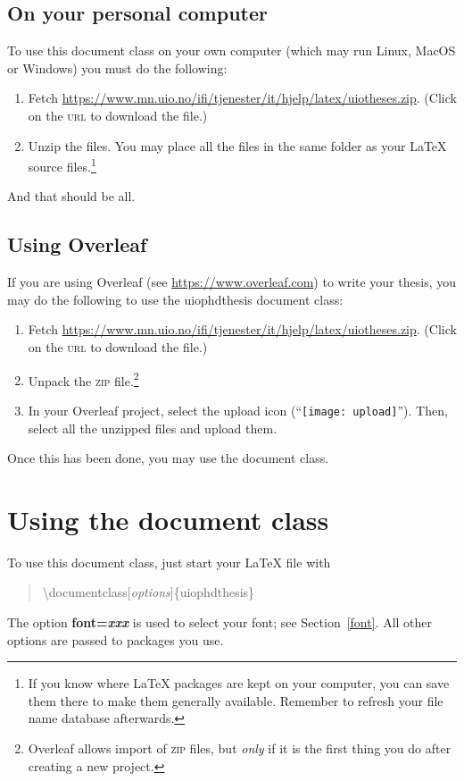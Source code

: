 \documentclass[UKenglish]{uiophdthesis}
\newcommand{\bsl}{\textbackslash}
\newcommand{\p}[1]{\textsf{#1}}
\newcommand{\pb}[1]{\textbf{\p{#1}}}
\newcommand{\pcmd}[1]{\p{\bsl #1}}
\newcommand{\ppar}[1]{\p{\{#1\}}}
\begin{document}
\section{On your personal computer\label{privat-pc}}
To use this document class on your own computer (which may run Linux, MacOS
or Windows) you must do the following:
\begin{enumerate}
\item Fetch
  \url{https://www.mn.uio.no/ifi/tjenester/it/hjelp/latex/uiotheses.zip}. (Click
  on the \textsc{url} to download the file.)
  
\item Unzip the files. You may place all the files in the same folder
  as your \LaTeX{} source files.\footnote{If you know where \LaTeX{}
    packages are kept on your computer, you 
    can save them there to make them generally available. Remember to
    refresh your file name database afterwards.}
\end{enumerate}
And that should be all.

\section{Using Overleaf}
If you are using Overleaf (see \url{https://www.overleaf.com}) to
write your thesis, you may do the following to use the \p{uiophdthesis}
document class:
\begin{enumerate}
\item Fetch 
  \url{https://www.mn.uio.no/ifi/tjenester/it/hjelp/latex/uiotheses.zip}. (Click
  on the \textsc{url} to download the file.)

\item Unpack the \textsc{zip} file.\footnote{Overleaf allows import of
  \textsc{zip} files, but \emph{only} if it is the first thing you do
  after creating a new project.}

\item In your Overleaf project, select the upload icon
  (``\texttt{[image: upload]}''). Then, select all the
  unzipped files and upload them.
\end{enumerate}
Once this has been done, you may use the document class.

\chapter{Using the document class}
To use this document class, just start your \LaTeX{} file with
\begin{quote}
  \pcmd{documentclass[\emph{options}]}\ppar{uiophdthesis}
\end{quote}
The option \pb{font=\emph{xxx}} is used to select your font; see
Section~\vref{font}. All other options are passed to packages you use.
\end{document}
